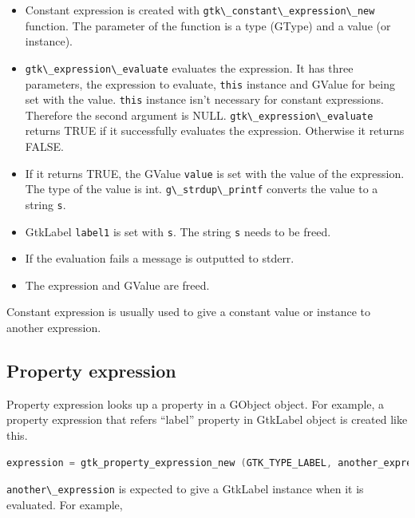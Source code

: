 \begin{itemize}
\tightlist
\item
  Constant expression is created with
  \passthrough{\lstinline!gtk\_constant\_expression\_new!} function. The
  parameter of the function is a type (GType) and a value (or instance).
\item
  \passthrough{\lstinline!gtk\_expression\_evaluate!} evaluates the
  expression. It has three parameters, the expression to evaluate,
  \passthrough{\lstinline!this!} instance and GValue for being set with
  the value. \passthrough{\lstinline!this!} instance isn't necessary for
  constant expressions. Therefore the second argument is NULL.
  \passthrough{\lstinline!gtk\_expression\_evaluate!} returns TRUE if it
  successfully evaluates the expression. Otherwise it returns FALSE.
\item
  If it returns TRUE, the GValue \passthrough{\lstinline!value!} is set
  with the value of the expression. The type of the value is int.
  \passthrough{\lstinline!g\_strdup\_printf!} converts the value to a
  string \passthrough{\lstinline!s!}.
\item
  GtkLabel \passthrough{\lstinline!label1!} is set with
  \passthrough{\lstinline!s!}. The string \passthrough{\lstinline!s!}
  needs to be freed.
\item
  If the evaluation fails a message is outputted to stderr.
\item
  The expression and GValue are freed.
\end{itemize}

Constant expression is usually used to give a constant value or instance
to another expression.

\hypertarget{property-expression}{%
\subsection{Property expression}\label{property-expression}}

Property expression looks up a property in a GObject object. For
example, a property expression that refers ``label'' property in
GtkLabel object is created like this.

\begin{lstlisting}[language=C]
expression = gtk_property_expression_new (GTK_TYPE_LABEL, another_expression, "label");
\end{lstlisting}

\passthrough{\lstinline!another\_expression!} is expected to give a
GtkLabel instance when it is evaluated. For example,

